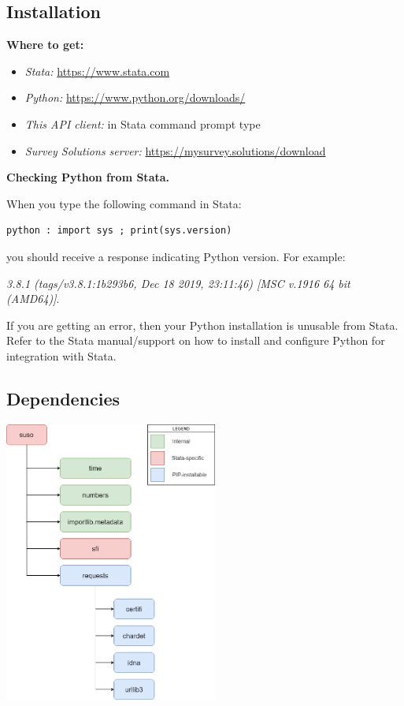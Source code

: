 \vskip16pt
\subsection{Installation}
\par
\vskip16pt
\textbf{Where to get:}\par
\begin{itemize}
  \item \textit{Stata:} \href{https://www.stata.com}{https://www.stata.com}
  \item \textit{Python:} \href{https://www.python.org/downloads/}{https://www.python.org/downloads/}
  \item \textit{This API client:} in Stata command prompt type 
  \item \textit{Survey Solutions server:} \href{https://mysurvey.solutions/download}{https://mysurvey.solutions/download}
\end{itemize}

\vskip16pt
\textbf{Checking Python from Stata.}\par
\vskip16pt
When you type the following command in Stata:\par
\vskip16pt
\begin{lstlisting}
python : import sys ; print(sys.version)
\end{lstlisting}
\vskip16pt
you should receive a response indicating Python version. For example: \par
\vskip16pt
\textit{3.8.1 (tags/v3.8.1:1b293b6, Dec 18 2019, 23:11:46) [MSC v.1916 64 bit (AMD64)]}.\par
\vskip16pt
If you are getting an error, then your Python installation is unusable from Stata. Refer to the Stata manual/support on how to install and configure Python for integration with Stata.


\vskip16pt
\subsection{Dependencies}
\begin{center}
    \includegraphics[width=70mm]{images/generated/susoapi-dependencies.png}
\end{center}

